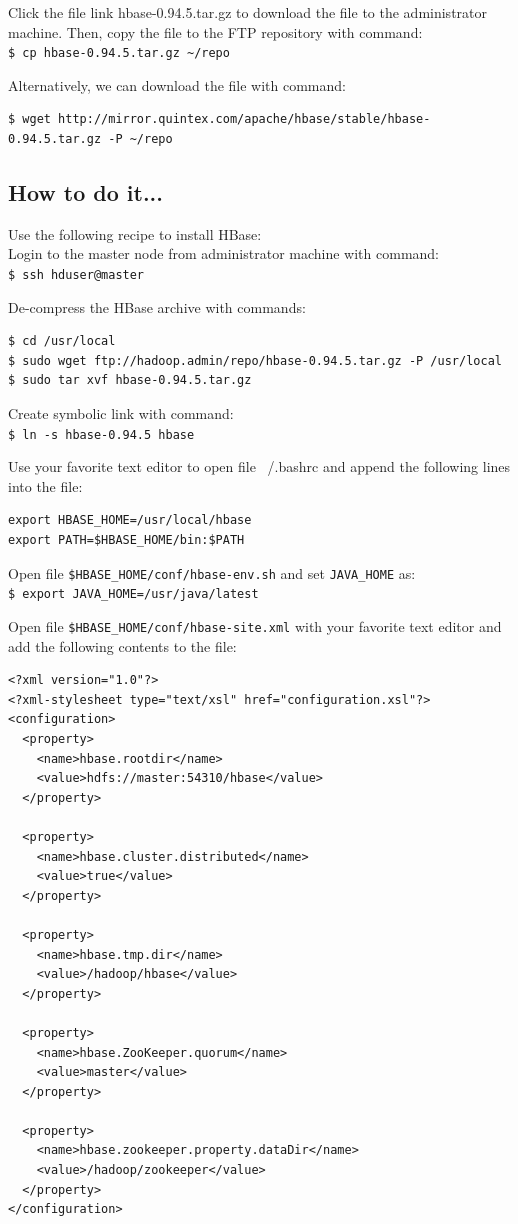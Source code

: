 Click the file link hbase-0.94.5.tar.gz to download the file to the administrator machine. Then, copy the file to the FTP repository with command: \\
\verb|$ cp hbase-0.94.5.tar.gz ~/repo|

Alternatively, we can download the file with command:
\lstset{style=bashstyle}
\begin{lstlisting}
$ wget http://mirror.quintex.com/apache/hbase/stable/hbase-0.94.5.tar.gz -P ~/repo
\end{lstlisting}

\subsection*{How to do it...}
Use the following recipe to install HBase: \\
Login to the master node from administrator machine with command: \\
\verb|$ ssh hduser@master|

De-compress the HBase archive with commands:
\lstset{style=bashstyle}
\begin{lstlisting}
$ cd /usr/local
$ sudo wget ftp://hadoop.admin/repo/hbase-0.94.5.tar.gz -P /usr/local
$ sudo tar xvf hbase-0.94.5.tar.gz
\end{lstlisting}

Create symbolic link with command: \\
\verb|$ ln -s hbase-0.94.5 hbase|

Use your favorite text editor to open file ~/.bashrc and append the following lines into the file:
\begin{verbatim}
export HBASE_HOME=/usr/local/hbase
export PATH=$HBASE_HOME/bin:$PATH
\end{verbatim}

Open file \verb|$HBASE_HOME/conf/hbase-env.sh| and set \verb|JAVA_HOME| as: \\
\verb|$ export JAVA_HOME=/usr/java/latest|

Open file \verb|$HBASE_HOME/conf/hbase-site.xml| with your favorite text editor and add the following contents to the file:
\lstset{style=bashstyle}
\begin{lstlisting}
<?xml version="1.0"?>
<?xml-stylesheet type="text/xsl" href="configuration.xsl"?>
<configuration>
  <property>
    <name>hbase.rootdir</name>
    <value>hdfs://master:54310/hbase</value>
  </property>

  <property>
    <name>hbase.cluster.distributed</name>
    <value>true</value>
  </property>

  <property>
    <name>hbase.tmp.dir</name>
    <value>/hadoop/hbase</value>
  </property>

  <property>
    <name>hbase.ZooKeeper.quorum</name>
    <value>master</value>
  </property>

  <property>
    <name>hbase.zookeeper.property.dataDir</name>
    <value>/hadoop/zookeeper</value>
  </property>
</configuration>
\end{lstlisting}


